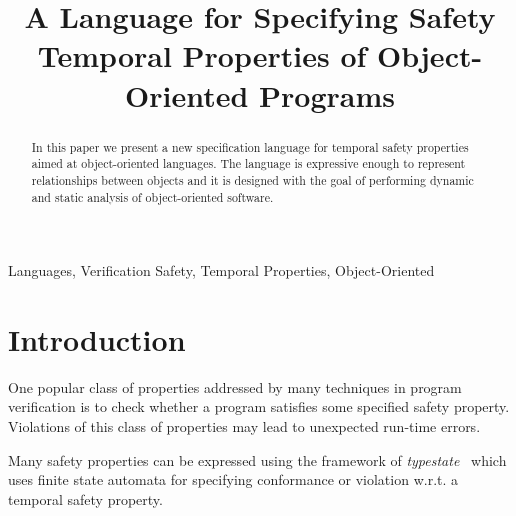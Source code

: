 \documentclass[preprint]{sigplanconf} %
\title{A Language for Specifying Safety Temporal Properties of Object-Oriented Programs}
\theoremstyle{definition}
\begin{document}
\maketitle

\begin{abstract} %
In this paper we present a new specification language for temporal safety properties aimed at object-oriented languages.
The language is expressive enough to represent relationships between objects and it is designed with the goal of performing dynamic and static analysis of object-oriented software.
\end{abstract}
\terms Languages, Verification
\keywords Safety, Temporal Properties, Object-Oriented

\section{Introduction} %
One popular class of properties addressed by many techniques in program verification is to check whether a program satisfies some specified safety property.  
Violations of this class of properties may lead to unexpected run-time errors.

Many safety properties can be expressed using the framework of {\em typestate}~\cite{strom1986} which uses finite state automata for specifying conformance or violation w.r.t. a temporal safety property.
\end{document}
